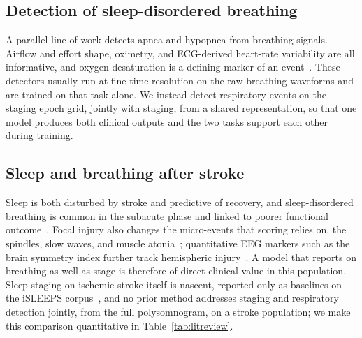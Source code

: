 \documentclass[journal]{IEEEtran}
\begin{document}
\subsection{Detection of sleep-disordered breathing}
A parallel line of work detects apnea and hypopnea from breathing signals. Airflow and effort
shape, oximetry, and ECG-derived heart-rate variability are all informative, and oxygen
desaturation is a defining marker of an event~\cite{jing2025cpap}. These detectors usually run
at fine time resolution on the raw breathing waveforms and are trained on that task alone. We
instead detect respiratory events on the staging epoch grid, jointly with staging, from a
shared representation, so that one model produces both clinical outputs and the two tasks
support each other during training.

\subsection{Sleep and breathing after stroke}
Sleep is both disturbed by stroke and predictive of recovery, and sleep-disordered breathing
is common in the subacute phase and linked to poorer functional
outcome~\cite{bassetti2006sleep,denis2024sleep,tellenbach2023brainstem}. Focal injury also changes
the micro-events that scoring relies on, the spindles, slow waves, and muscle
atonia~\cite{gottselig2002stroke,fernandez2019spindles,simpson2023laterality,facchin2020slowwaves,zheng2025spindles};
quantitative EEG markers such as the brain symmetry index further track hemispheric
injury~\cite{anastasi2017bsi}. A model that reports on breathing as well as stage is therefore of
direct clinical value in this population. Sleep staging on ischemic stroke itself is nascent, reported only as baselines on
the iSLEEPS corpus~\cite{maiti2026isleeps}, and no prior method addresses staging and respiratory
detection jointly, from the full polysomnogram, on a stroke population; we make this comparison
quantitative in Table~\ref{tab:litreview}.

\end{document}
